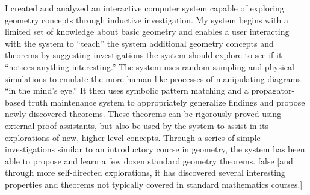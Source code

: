 %
%
%
I created and analyzed an interactive computer system capable of
exploring geometry concepts through inductive investigation.  My
system begins with a limited set of knowledge about basic geometry and
enables a user interacting with the system to ``teach'' the system
additional geometry concepts and theorems by suggesting investigations
the system should explore to see if it ``notices anything
interesting.''  The system uses random sampling and physical
simulations to emulate the more human-like processes of manipulating
diagrams ``in the mind's eye.'' It then uses symbolic pattern matching
and a propagator-based truth maintenance system to appropriately
generalize findings and propose newly discovered theorems. These
theorems can be rigorously proved using external proof assistants, but
also be used by the system to assist in its explorations of new,
higher-level concepts. Through a series of simple investigations
similar to an introductory course in geometry, the system has been
able to propose and learn a few dozen standard geometry theorems.
\if false
[and
  through more self-directed explorations, it has discovered several
  interesting properties and theorems not typically covered in
  standard mathematics courses.]
\fi
